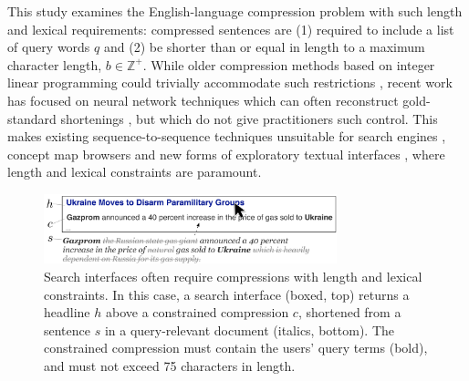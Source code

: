 \documentclass[11pt,a4paper]{article}
\begin{document}
This study examines the English-language compression problem with such length and lexical requirements: compressed sentences are (1) required to include a list of query words $q$ and (2) be shorter than or equal in length to a maximum character length, $b \in \mathbb{Z}^{+}$. While older compression methods based on integer linear programming could trivially accommodate such restrictions \cite{clarke2008global,filippova2013overcoming}, recent work has focused on neural network techniques which can often reconstruct gold-standard shortenings \cite{filippova2015sentence}, but which do not give practitioners such control. This makes existing sequence-to-sequence techniques unsuitable for search engines \cite{hearst2009search}, concept map browsers \cite{falke2017graphdocexplore} and new forms of exploratory textual interfaces \cite{marchionini2006exploratory}, where length and lexical constraints are paramount. 

\begin{figure}[htb!]
\includegraphics[width=8.5cm]{qf.pdf}
\caption{Search interfaces often require compressions with length and lexical constraints. In this case, a search interface (boxed, top) returns a headline $h$ above a constrained compression $c$, shortened from a sentence $s$ in a query-relevant document (italics, bottom). The constrained compression must contain the users' query terms (bold), and must not exceed 75 characters in length.}
\label{f:qf}
\end{figure}
\end{document}
